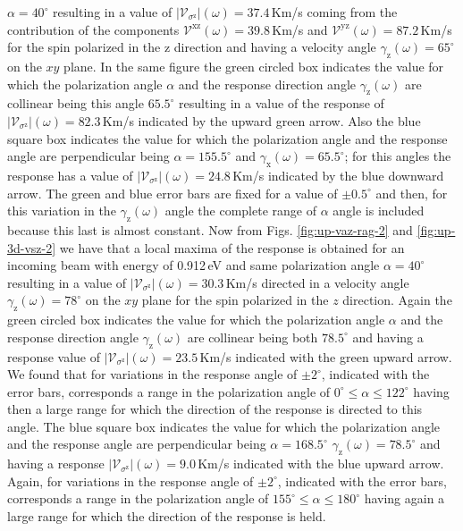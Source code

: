 \documentclass[prb,11pt,tightenlines,twocolumn,aps]{revtex4-1}
\begin{document}
$\alpha=40^{\circ}$ resulting in a value of
$|\mathcal{V}_{\sigma^{\mathrm{z}}}|(\omega)=37.4$\,Km/s coming from the
contribution of the components $\mathcal{V}^{\mathrm{xz}}(\omega)=39.8$\,Km/s
and $\mathcal{V}^{\mathrm{yz}}(\omega)=87.2$\,Km/s for the spin polarized in the
$\mathrm{z}$ direction and having a velocity angle
$\gamma_{\mathrm{z}}(\omega)=65^{\circ}$ on the $xy$ plane.
% 
In the same figure the green circled box indicates the value for which the
polarization angle $\alpha$ and the response direction angle
$\gamma_{\mathrm{z}}(\omega)$ are collinear being this angle $65.5^{\circ}$
resulting in a value of the response of
$|\mathcal{V}_{\sigma^{\mathrm{z}}}|(\omega)=82.3$\,Km/s indicated by the upward
green arrow.
% 
Also the blue square box indicates the value for which the polarization angle
and the response angle are perpendicular being $\alpha=155.5^{\circ}$ and
$\gamma_{\mathrm{x}}(\omega)=65.5^{\circ}$; for this angles the response has a
value of $|\mathcal{V}_{\sigma^{\mathrm{z}}}|(\omega)=24.8$\,Km/s indicated by
the blue downward arrow.
% 
The green and blue error bars are fixed for a value of $\pm0.5^{\circ}$ and
then, for this variation in the $\gamma_{\mathrm{z}}(\omega)$ angle the complete
range of $\alpha$ angle is included because this last is almost constant.
% 
Now from Figs. \ref{fig:up-vaz-rag-2} and \ref{fig:up-3d-vsz-2} we have that a
local maxima of the response is obtained for an incoming beam with energy of
0.912\,eV and same polarization angle $\alpha=40^{\circ}$ resulting in a value
of $|\mathcal{V}_{\sigma^{\mathrm{z}}}|(\omega)=30.3$\,Km/s directed in a
velocity angle $\gamma_{\mathrm{z}}(\omega)=78^{\circ}$ on the $xy$ plane for
the spin polarized in the $z$ direction.
% 
Again the green circled box indicates the value for which the polarization angle
$\alpha$ and the response direction angle $\gamma_{\mathrm{z}}(\omega)$ are
collinear being both $78.5^{\circ}$ and having a response value of
$|\mathcal{V}_{\sigma^{\mathrm{z}}}|(\omega)=23.5$\,Km/s indicated with the
green upward arrow. We found that for variations in the response angle of $\pm
2^{\circ}$, indicated with the error bars, corresponds a range in the
polarization angle of $0^{\circ} \leq \alpha \leq 122^{\circ}$ having then a
large range for which the direction of the response is directed to this angle.
% 
The blue square box indicates the value for which the polarization angle and the
response angle are perpendicular being $\alpha=168.5^{\circ}$
$\gamma_{\mathrm{z}}(\omega)=78.5^{\circ}$ and having a response
$|\mathcal{V}_{\sigma^{\mathrm{z}}}|(\omega)=9.0$\,Km/s indicated with the blue
upward arrow. Again, for variations in the response angle of $\pm2^{\circ}$,
indicated with the error bars, corresponds a range in the polarization angle of
$155^{\circ} \leq \alpha \leq 180^{\circ}$ having again a large range for which
the direction of the response is held.
\end{document}
